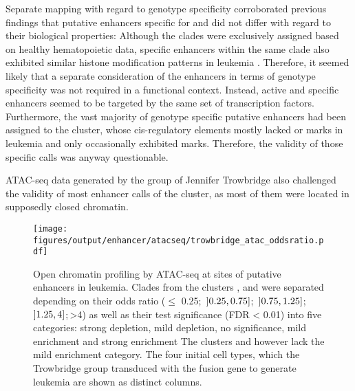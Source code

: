 Separate mapping with regard to genotype specificity corroborated previous findings that putative enhancers specific for \dnmtwt and \dnmtchip did not differ with regard to their biological properties: Although the clades were exclusively assigned based on healthy hematopoietic data, specific enhancers within the same clade also exhibited similar histone modification patterns in leukemia . Therefore, it seemed likely that a separate consideration of the enhancers in terms of genotype specificity was not required in a functional context. Instead, active \dnmtwt and \dnmtchip specific enhancers seemed to be targeted by the same set of transcription factors. Furthermore, the vast majority of genotype specific putative enhancers had been assigned to the \amitten cluster, whose cis-regulatory elements mostly lacked \hiseighteenac or \histwentysevenac marks in leukemia and only occasionally exhibited \hisseventyninetwo marks. Therefore, the validity of those specific calls was anyway questionable.\label{chap:r:enhancers:clearyend} 
 
ATAC-seq data generated by the group of Jennifer Trowbridge\cite{George2016} also challenged the validity of most enhancer calls of the \amitten cluster, as most of them were located in supposedly closed chromatin.\label{chap:r:enhancers:trowbridgestart} 

\begin{figure}[!btp]
	\texttt{[image: figures/output/enhancer/atacseq/trowbridge\_atac\_oddsratio.pdf]}
	\caption{Open chromatin profiling by ATAC-seq at sites of putative enhancers in \mllafnine leukemia. Clades from the clusters \amittwo, \amitthree and \amitten were separated depending on their odds ratio ($\leq$ \num{0.25};\, \ensuremath{\interval[open left]{0.25}{0.75}};\, \ensuremath{\interval[open left]{0.75}{1.25}};\, \ensuremath{\interval[open left]{1.25}{4}};\,>\num{4}) as well as their test significance (FDR < \num{0.01}) into five categories: strong depletion, mild depletion, no significance, mild enrichment and strong enrichment The clusters  and  however lack the mild enrichment category. The four initial cell types, which the Trowbridge group transduced with the \mllafnine fusion gene to generate leukemia are shown as distinct columns.}
	\label{fig:enhancers:trowbridge_atac_oddsratio}
\end{figure}

